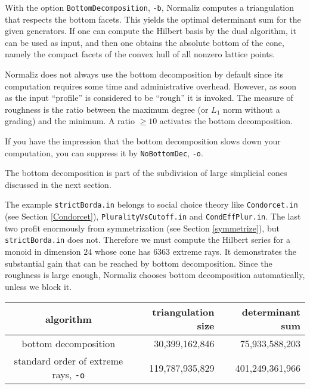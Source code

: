 \documentclass[12pt,a4paper]{scrartcl}
\theoremstyle{definition}
\def\ttt{\texttt}
\begin{document}
{\begin{center}
\end{center}
With the option \texttt{BottomDecomposition}, \texttt{-b}, Normaliz computes a triangulation that respects the bottom facets. This yields the optimal determinant sum for the given generators. If one can compute the Hilbert basis by the dual algorithm, it can be used as input, and then one obtains the absolute bottom of the cone, namely the compact facets of the convex hull of all nonzero lattice points. 

Normaliz does not always use the bottom decomposition by default since its computation requires some time and administrative overhead. However, as soon as the input ``profile'' is considered to be ``rough'' it is invoked. The measure of roughness is the ratio between the maximum degree (or $L_1$ norm without a grading) and the minimum. A ratio $\ge 10$ activates the bottom decomposition. 

If you have the impression that the bottom decomposition slows down your computation, you can suppress it by \texttt{NoBottomDec}, \texttt{-o}.

The bottom decomposition is part of the subdivision of large simplicial cones discussed in the next section.

The example \verb|strictBorda.in| belongs to social choice theory like \verb|Condorcet.in| (see Section \ref{Condorcet}), \verb|PluralityVsCutoff.in| and \verb|CondEffPlur.in|. The last two profit enormously from symmetrization (see Section \ref{symmetrize}), but \verb| strictBorda.in| does not. Therefore we must compute the Hilbert series for a monoid in dimension $24$ whose cone has $6363$ extreme rays. It demonstrates the substantial gain that can be reached by bottom decomposition. Since the roughness is large enough, Normaliz chooses bottom decomposition automatically, unless we block it. 
\begin{center}
	\begin{tabular}{|c|r|r|}\hline
		algorithm	& triangulation size& determinant sum \\ \hline
		bottom decomposition& 30,399,162,846 &75,933,588,203 \\ \hline
		standard order of extreme rays,  \ttt{-o} & 119,787,935,829 & 401,249,361,966\\ \hline
	\end{tabular}
\end{center}

}
\end{document}
